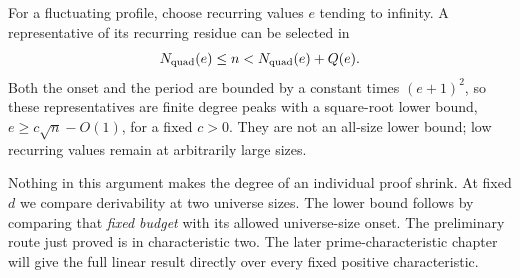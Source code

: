 For a fluctuating profile, choose recurring values $e$ tending to
infinity. A representative of its recurring residue can be selected
in
\[
       N_{\rm quad}(e)\le n<N_{\rm quad}(e)+Q(e).
\]
Both the onset and the period are bounded by a constant times
$(e+1)^2$, so these representatives are finite degree peaks with a square-root lower bound, $e\ge c\sqrt n-O(1)$, for a fixed $c>0$. They are not an
all-size lower bound; low recurring values remain at arbitrarily
large sizes.

Nothing in this argument makes the degree of an individual proof
shrink. At fixed $d$ we compare derivability at two universe sizes.
The lower bound follows by comparing that \emph{fixed budget} with
its allowed universe-size onset. The preliminary route just proved
is in characteristic two. The later prime-characteristic chapter
will give the full linear result directly over every fixed positive
characteristic.
